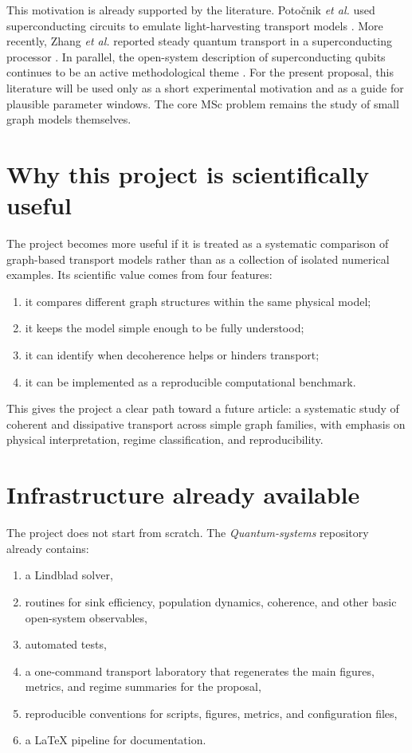 \documentclass[11pt,a4paper]{article}
\begin{document}
This motivation is already supported by the literature. Poto\v{c}nik
\emph{et al.} used superconducting circuits to emulate light-harvesting
transport models \citep{potocnik_2018}. More recently, Zhang \emph{et al.}
reported steady quantum transport in a superconducting processor
\citep{zhang_2024_transport}. In parallel, the open-system description of
superconducting qubits continues to be an active methodological theme
\citep{naeij_2025}. For the present proposal, this literature will be used only
as a short experimental motivation and as a guide for plausible parameter
windows. The core MSc problem remains the study of small graph models
themselves.

\section{Why this project is scientifically useful}

The project becomes more useful if it is treated as a systematic comparison of
graph-based transport models rather than as a collection of isolated numerical
examples. Its scientific value comes from four features:
\begin{enumerate}
  \item it compares different graph structures within the same physical model;
  \item it keeps the model simple enough to be fully understood;
  \item it can identify when decoherence helps or hinders transport;
  \item it can be implemented as a reproducible computational benchmark.
\end{enumerate}

This gives the project a clear path toward a future article: a systematic study
of coherent and dissipative transport across simple graph families, with emphasis
on physical interpretation, regime classification, and reproducibility.

\section{Infrastructure already available}

The project does not start from scratch. The \emph{Quantum-systems} repository
already contains:
\begin{enumerate}
  \item a Lindblad solver,
  \item routines for sink efficiency, population dynamics, coherence, and other
  basic open-system observables,
  \item automated tests,
  \item a one-command transport laboratory that regenerates the main figures,
  metrics, and regime summaries for the proposal,
  \item reproducible conventions for scripts, figures, metrics, and
  configuration files,
  \item a \LaTeX{} pipeline for documentation.
\end{enumerate}
\end{document}
